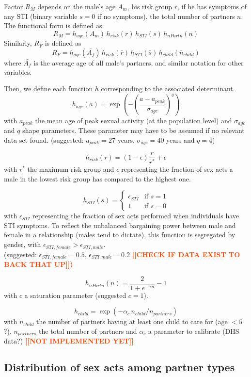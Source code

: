 \documentclass[11pt, onecolumn]{article}
\newcommand{\warning}[1]{\textbf{\textcolor{OrangeRed}{#1}}}
\begin{document}
Factor $R_M$ depends on the male's age $A_m$, his risk group $r$, if he has symptoms of any STI (binary variable $s=0$ if no symptoms), the total number of partners $n$. The functional form is defined as:
$$R_M= h_{age}(A_m)  \, h_{risk}(r)  \,h_{STI}(s) \,h_{nPartn}(n) $$
Similarly, $R_F$ is defined as
$$R_F=  h_{age}(\bar{A_f})  \, h_{risk}(\bar{r})  \,h_{STI}(\bar{s}) \,h_{child}(\bar{n}_{child})$$
where $\bar{A_f}$ is the average age of all male's partners, and similar notation for other variables.

Then, we define each function $h$ corresponding to the associated determinant.
$$h_{age}(a) = \exp \left(-\left(\frac{a-a_{peak}}{\sigma_{age}}\right)^q \right)$$
with $a_{peak}$ the mean age of peak sexual activity (at the population level) and $\sigma_{age}$ and $q$ shape parameters. These parameter may have to be assumed if no relevant data set found. (suggested: $a_{peak}=27$ years, $\sigma_{age}=40$ years and $q=4$) 

$$h_{risk}(r) = (1-\epsilon)\frac{r}{r^*} + \epsilon $$
with $r^*$ the maximum risk group and $\epsilon$ representing the fraction of sex acts a male in the lowest risk group has compared to the highest one.

$$h_{STI}(s) = 
\begin{cases}
\epsilon_{STI} & \text{if } s=1\\
1 & \text{if } s=0
\end{cases}$$
with $\epsilon_{STI}$ representing the fraction of sex acts performed when individuals have STI symptoms. To reflect the unbalanced bargaining power between male and female in a relationship (males tend to dictate), this function is segregated by gender, with $\epsilon_{STI,female}>\epsilon_{STI,male}$. \\(suggested: $\epsilon_{STI,female}=0.5, \,\epsilon_{STI,male}=0.2$ \warning{[[CHECK IF DATA EXIST TO BACK THAT UP]])}

$$h_{nPartn}(n) = \frac{2}{1+e^{-c\, n}} -1 $$
with $c$ a saturation parameter (suggested $c=1$).

$$h_{child} = \exp(-\alpha_c \, n_{child}/n_{partners})$$
with $ n_{child}$ the number of partners having at least one child to care for (age $<5$?), $n_{partners}$ the total number of partners and $\alpha_c$ a parameter to calibrate (DHS data?) \warning{[[NOT IMPLEMENTED YET]]}

\subsection{Distribution of sex acts among partner types}
\end{document}
